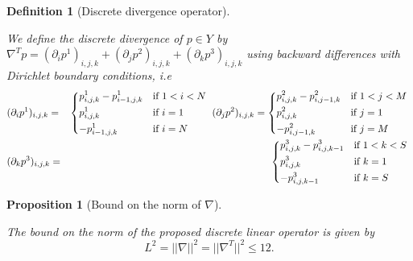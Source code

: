 \documentclass{scrreprt}
\newtheorem{proposition}[theorem]{Proposition}
\newtheorem{definition}[theorem]{Definition}
\begin{document}
        \begin{definition}[Discrete divergence operator] %
        \label{def:discrete_divergence_operator_ms}

            We define the discrete divergence of $p \in Y$ by $\nabla^{T} p = (\partial_{i}p^{1})_{i, j, k} + (\partial_{j}p^{2})_{i, j, k} + (\partial_{k}p^{3})_{i, j, k}$ using backward differences with Dirichlet boundary conditions, i.e
                \begin{eqnarray}
                    &(\partial_{i}p^{1})_{i, j, k} =&
                        \begin{dcases*}
                            p^{1}_{i, j, k} - p^{1}_{i-1, j, k} & \textnormal{if $1 < i < N$} \\
                            p^{1}_{i, j, k} & \textnormal{if $i = 1$} \\
                            -p^{1}_{i-1, j, k} & \textnormal{if $i = N$}
                        \end{dcases*}
                    \notag
                    (\partial_{j}p^{2})_{i, j, k} =
                        \begin{dcases*}
                            p^{2}_{i, j, k} - p^{2}_{i, j-1, k} & \textnormal{if $1 < j < M$} \\
                            p^{2}_{i, j, k} & \textnormal{if $j = 1$} \\
                            -p^{2}_{i, j-1, k} & \textnormal{if $j = M$}
                        \end{dcases*}
                    \notag \\
                    &(\partial_{k}p^{3})_{i, j, k} =&
                        \begin{dcases*}
                            p^{3}_{i, j, k} - p^{3}_{i, j, k-1} & \textnormal{if $1 < k < S$} \\
                            p^{3}_{i, j, k} & \textnormal{if $k = 1$} \\
                            -p^{3}_{i, j, k-1} & \textnormal{if $k = S$}
                        \end{dcases*}
                    \notag
                \end{eqnarray}

        \end{definition}

        \begin{proposition}[Bound on the norm of $\nabla$] %
            \label{prop:bound_on_the_norm_ms}

            The bound on the norm of the proposed discrete linear operator is given by
                $$
                    L^{2} = ||\nabla||^{2} = ||\nabla^{T}||^{2} \le 12.
                $$
        \end{proposition}
\end{document}
